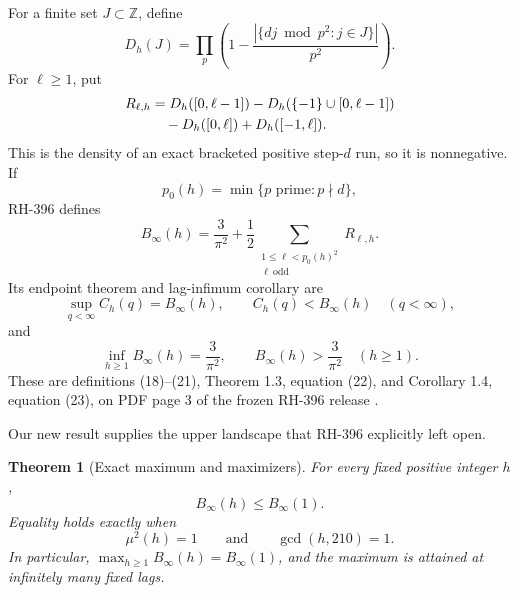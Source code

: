 \documentclass[12pt,a4paper]{article}
\newtheorem{theorem}{Theorem}[section]
\theoremstyle{definition}
\newcommand{\mob}{\mu}
\newcommand{\Z}{\mathbb Z}
\newcommand{\Bin}{B_\infty}
\begin{document}
For a finite set \(J\subset\Z\), define
\begin{equation}
 D_h(J)=\prod_p\left(
 1-\frac{|\{dj\bmod p^2:j\in J\}|}{p^2}\right).
 \label{eq:Dh}
\end{equation}
For \(\ell\geq1\), put
\begin{align}
 R_{\ell,h}
 &=D_h([0,\ell-1])-D_h(\{-1\}\cup[0,\ell-1])
 \notag\\
 &\quad-D_h([0,\ell])+D_h([-1,\ell]).
 \label{eq:R-def}
\end{align}
This is the density of an exact bracketed positive step-\(d\) run, so it is
nonnegative.  If
\begin{equation}
 p_0(h)=\min\{p\text{ prime}:p\nmid d\},
 \label{eq:p0}
\end{equation}
RH-396 defines
\begin{equation}
 \Bin(h)=\frac3{\pi^2}
 +\frac12\sum_{\substack{1\leq\ell<p_0(h)^2\\\ell\ \mathrm{odd}}}
 R_{\ell,h}.
 \label{eq:B-run}
\end{equation}
Its endpoint theorem and lag-infimum corollary are
\begin{equation}
 \sup_{q<\infty}C_h(q)=\Bin(h),\qquad
 C_h(q)<\Bin(h)\quad(q<\infty),
 \label{eq:RH396-endpoint}
\end{equation}
and
\begin{equation}
 \inf_{h\geq1}\Bin(h)=\frac3{\pi^2},
 \qquad \Bin(h)>\frac3{\pi^2}\quad(h\geq1).
 \label{eq:RH396-infimum}
\end{equation}
These are definitions (18)--(21), Theorem 1.3, equation (22), and
Corollary 1.4, equation (23), on PDF page 3 of the frozen RH-396 release
\cite{RH396}.

Our new result supplies the upper landscape that RH-396 explicitly left open.

\begin{theorem}[Exact maximum and maximizers]
\label{thm:maximum}
For every fixed positive integer \(h\),
\begin{equation}
 \Bin(h)\leq\Bin(1).
 \label{eq:maximum-bound}
\end{equation}
Equality holds exactly when
\begin{equation}
 \mob^2(h)=1\qquad\text{and}\qquad\gcd(h,210)=1.
 \label{eq:maximizer-criterion}
\end{equation}
In particular, \(\max_{h\geq1}\Bin(h)=\Bin(1)\), and the maximum is attained
at infinitely many fixed lags.
\end{theorem}
\end{document}
